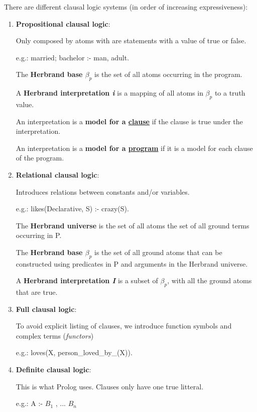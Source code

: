 \documentclass[12pt, oneside]{report}
\numberwithin{definition}{chapter}
\numberwithin{theorem}{chapter}
\numberwithin{lemma}{chapter}
\numberwithin{Rule}{chapter}
\numberwithin{equation}{chapter}
\begin{document}
There are different clausal logic systems (in order of increasing expressiveness):
\begin{enumerate}
\item \textbf{Propositional clausal logic}:

Only composed by atoms with are statements with a value of true or false.

e.g.: married; bachelor :- man, adult.

The \textbf{Herbrand base $\beta_p$} is the set of all atoms occurring in the program.

A \textbf{Herbrand interpretation \textit{i}} is a mapping of all atoms in $\beta_p$ to a truth value.

An interpretation is a \textbf{model for a \underline{clause}} if the clause is true under the interpretation.

An interpretation is a \textbf{model for a \underline{program}} if it is a model for each clause of the program.



\item \textbf{Relational clausal logic}:

Introduces relations between constants and/or variables.

e.g.: likes(Declarative, S) :- crazy(S).

The \textbf{Herbrand universe} is the set of all atoms the set of all ground terms occurring in P.

The \textbf{Herbrand base $\beta_p$} is the set of all ground atoms that can be constructed using predicates in P and arguments in the Herbrand universe.

A \textbf{Herbrand interpretation \textit{I}} is a subset of $\beta_p$, with all the ground atoms that are true.




\item \textbf{Full clausal logic}:

To avoid explicit listing of clauses, we introduce function symbols and complex terms (\textit{functors}) 

e.g.: loves(X, person\_loved\_by\_(X)).




\item \textbf{Definite clausal logic}:

This is what Prolog uses. Clauses only have one true litteral.

e.g.: A :- $B_1$ , ... $B_n$

\end{enumerate}
\end{document}
